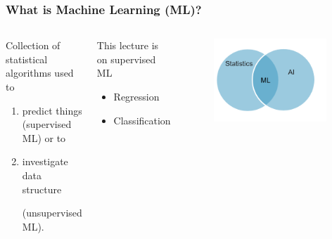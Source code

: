 \documentclass[
    utf8,
    aspectratio=169
]{beamer}  %
\begin{document}
\begin{frame}
\frametitle{What is Machine Learning (ML)?}
\begin{columns}
	\begin{block}{Collection of statistical algorithms used to}
		\begin{enumerate}
			\item predict things (supervised ML) or to
			\item investigate data structure 
			
			(unsupervised ML).
		\end{enumerate}
	\end{block}	
	\begin{block}{This lecture is on supervised ML}
		\begin{itemize}
			\item Regression
			\item Classification
		\end{itemize}
	\end{block}
	\begin{figure}
		\includegraphics[width=0.95\textwidth]{pics/ml.png}
	\end{figure}
\end{columns}
\end{frame}
%
\end{document}
